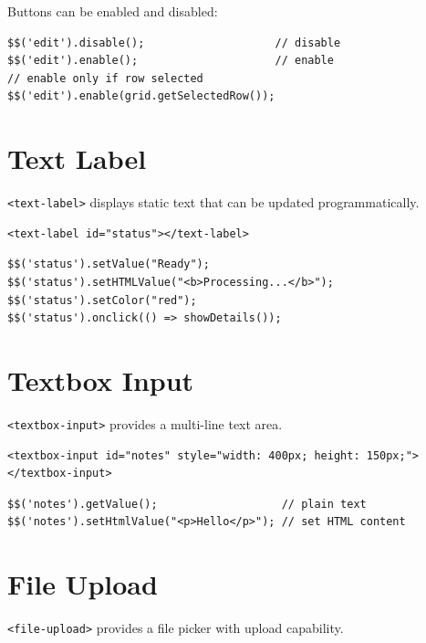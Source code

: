 \noindent
Buttons can be enabled and disabled:

\begin{lstlisting}[style=javascript]
$$('edit').disable();                    // disable
$$('edit').enable();                     // enable
// enable only if row selected
$$('edit').enable(grid.getSelectedRow());
\end{lstlisting}

\section{Text Label}
\label{sec:comp-label}

\texttt{<text-label>} displays static text that can be updated programmatically.

\begin{lstlisting}[style=html]
<text-label id="status"></text-label>
\end{lstlisting}

\begin{lstlisting}[style=javascript]
$$('status').setValue("Ready");
$$('status').setHTMLValue("<b>Processing...</b>");
$$('status').setColor("red");
$$('status').onclick(() => showDetails());
\end{lstlisting}

\section{Textbox Input}
\label{sec:comp-textbox}

\texttt{<textbox-input>} provides a multi-line text area.

\begin{lstlisting}[style=html]
<textbox-input id="notes" style="width: 400px; height: 150px;">
</textbox-input>
\end{lstlisting}

\begin{lstlisting}[style=javascript]
$$('notes').getValue();                   // plain text
$$('notes').setHtmlValue("<p>Hello</p>"); // set HTML content
\end{lstlisting}

\section{File Upload}
\label{sec:comp-file}

\texttt{<file-upload>} provides a file picker with upload capability.


